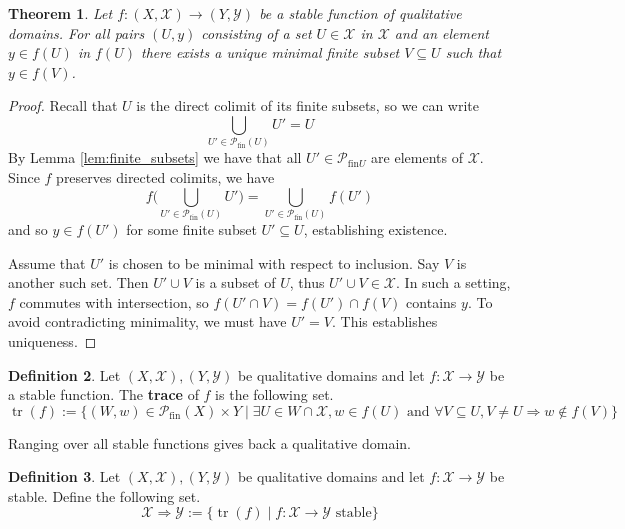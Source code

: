 \documentclass[12pt]{article}
\theoremstyle{plain}
\newtheorem{thm}{Theorem}[subsection] %
\theoremstyle{definition}
\newtheorem{defn}[thm]{Definition} %
\newcommand{\scr}[1]{\mathscr{#1}}
\newcommand{\call}[1]{\mathcal{#1}}
\newcommand{\lto}{\longrightarrow}
\begin{document}
	\begin{thm}\label{thm:representation}
		Let $f: (X,\scr{X}) \lto (Y, \scr{Y})$ be a stable function of qualitative domains. For all pairs $(U, y)$ consisting of a set $U \in \scr{X}$ in $\scr{X}$ and an element $y \in f(U)$ in $f(U)$ there exists a unique minimal finite subset $V \subseteq U$ such that $y \in f(V)$.
		\end{thm}
	\begin{proof}
		Recall that $U$ is the direct colimit of its finite subsets, so we can write
		\begin{equation}
			\bigcup_{U' \in \call{P}_{\text{fin}}(U)}U' = U
			\end{equation}
		By Lemma \ref{lem:finite_subsets} we have that all $U' \in \call{P}_{\text{fin}U}$ are elements of $\scr{X}$. Since $f$ preserves directed colimits, we have
		\begin{equation}
			f\Big(\bigcup_{U' \in \call{P}_{\text{fin}}(U)}U'\Big) = \bigcup_{U' \in \call{P}_{\text{fin}}(U)}f(U')
			\end{equation}
		and so $y \in f(U')$ for some finite subset $U' \subseteq U$, establishing existence.
		
		Assume that $U'$ is chosen to be minimal with respect to inclusion. Say $V$ is another such set. Then $U' \cup V$ is a subset of $U$, thus $U' \cup V \in \scr{X}$. In such a setting, $f$ commutes with intersection, so $f(U' \cap V) = f(U') \cap f(V)$ contains $y$. To avoid contradicting minimality, we must have $U' = V$. This establishes uniqueness.
		\end{proof}
	
	\begin{defn}
		Let $(X, \scr{X}), (Y, \scr{Y})$ be qualitative domains and let $f: \scr{X} \lto \scr{Y}$ be a stable function. The \textbf{trace} of $f$ is the following set.
		\begin{equation}
			\operatorname{tr}(f) := \{ (W, w) \in \call{P}_{\text{fin}}(X) \times Y \mid \exists U \in W \cap \scr{X}, w \in f(U)\text{ and }\forall V \subseteq U, V \neq U \Rightarrow w \not\in f(V) \}
			\end{equation}
		\end{defn}
	
	Ranging over all stable functions gives back a qualitative domain.
	
	\begin{defn}\label{def:implication}
		Let $(X,\scr{X}), (Y, \scr{Y})$ be qualitative domains and let $f: \scr{X} \lto \scr{Y}$ be stable. Define the following set.
		\begin{equation}
			\scr{X} \Rightarrow \scr{Y} := \{ \operatorname{tr}(f) \mid f: \scr{X} \lto \scr{Y}\text{ stable} \}
			\end{equation}
		\end{defn}
	
\end{document}

